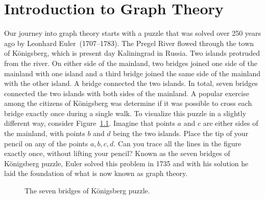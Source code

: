 
\chapter{Introduction to Graph Theory}
\label{chap:introduction}

Our journey into graph theory starts with a puzzle that was solved
over 250 years ago by Leonhard Euler~(1707--1783). The Pregel River
flowed through the town of K\"onigsberg, which is present day
Kaliningrad in Russia. Two islands protruded from the river. On either
side of the mainland, two bridges joined one side of the mainland with
one island and a third bridge joined the same side of the mainland
with the other island. A bridge connected the two islands. In total,
seven bridges connected the two islands with both sides of the
mainland. A popular exercise among the citizens of K\"onigsberg was
determine if it was possible to cross each bridge exactly once during
a single walk. To visualize this puzzle in a slightly different way,
consider
Figure~\ref{fig:introduction:seven_bridges_Konigsberg}. Imagine that
points $a$ and $c$ are either sides of the mainland, with points $b$
and $d$ being the two islands. Place the tip of your pencil on any of
the points $a,b,c,d$. Can you trace all the lines in the figure
exactly once, without lifting your pencil? Known as the seven bridges
of K\"onigsberg puzzle, Euler solved this problem in 1735 and with his
solution he laid the foundation of what is now known as graph theory.

\begin{figure}[!htbp]
\centering
{}
\caption{The seven bridges of K\"onigsberg puzzle.}
\label{fig:introduction:seven_bridges_Konigsberg}
\end{figure}


